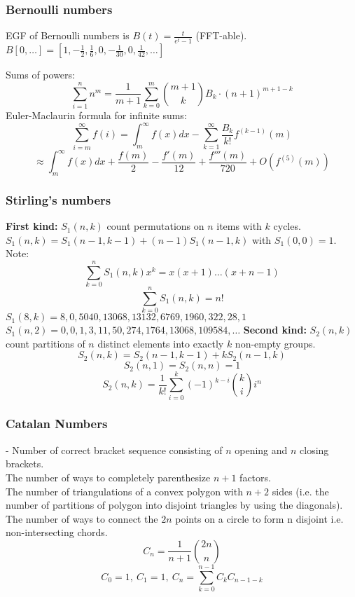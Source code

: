 \documentclass[
	a4paper,
	landscape,
	10pt,
]{article}
\begin{document}
\begin{multicols}{3}
	\subsubsection*{Bernoulli numbers}
		EGF of Bernoulli numbers is $B(t)=\frac{t}{e^t-1}$ (FFT-able).
		$B[0,\ldots] = [1, -\frac{1}{2}, \frac{1}{6}, 0, -\frac{1}{30}, 0, \frac{1}{42}, \ldots]$

		Sums of powers:
		\small
		\[ \sum_{i=1}^n n^m = \frac{1}{m+1} \sum_{k=0}^m \binom{m+1}{k} B_k \cdot (n+1)^{m+1-k} \]
		\normalsize
		Euler-Maclaurin formula for infinite sums:
		\small
		\[ \sum_{i=m}^{\infty} f(i) = \int_m^\infty f(x) dx - \sum_{k=1}^\infty \frac{B_k}{k!}f^{(k-1)}(m) \]
		\[ \approx \int_{m}^\infty f(x)dx + \frac{f(m)}{2} - \frac{f'(m)}{12} + \frac{f'''(m)}{720} + O(f^{(5)}(m)) \]
		\normalsize

	\subsubsection*{Stirling's numbers} \textbf{First kind:} $S_1(n, k)$ count permutations on $n$ items
		with $k$ cycles. $S_1(n, k) = S_1(n-1, k-1) + (n-1)S_1(n-1, k)$ with
		$S_1(0, 0) = 1$. Note:
		$$\sum_{k=0}^n S_1(n, k)x^k = x(x+1)\dots(x+n-1)$$
		$$ \sum_{k=0}^n S_1(n, k) = n! $$
		$S_1(8,k) = 8, 0, 5040, 13068, 13132, 6769, 1960, 322, 28, 1$ \\
		$S_1(n,2) = 0, 0, 1, 3, 11, 50, 274, 1764, 13068, 109584, \dots$
		\textbf{Second kind:} $S_2(n, k)$ count partitions of $n$
		distinct elements into exactly $k$ non-empty groups.
		$$ S_2(n, k) = S_2(n-1, k-1) + kS_2(n-1, k)$$
		$$S_2(n, 1) = S_2(n, n) = 1$$
		$$ S_2(n, k) = \frac{1}{k!}\sum_{i=0}^k (-1)^{k-i}\binom{k}{i}i^n $$

	\subsubsection*{Catalan Numbers} - Number of correct bracket sequence consisting of $n$ opening and $n$
		closing brackets. \\
		The number of ways to completely parenthesize $n+1$ factors. \\
		The number of triangulations of a convex polygon with $n+2$
		sides (i.e. the number of partitions of polygon into disjoint triangles by using the diagonals). \\
		The number of ways to connect the $2n$
		points on a circle to form n disjoint i.e. non-intersecting chords.
		$$ C_n = \frac{1}{n+1} \binom{2n}{n}$$
		$$ C_0 = 1,~C_1 = 1, ~C_n = \sum_{k=0}^{n-1}C_k C_{n-1-k}  $$


\end{multicols}
\end{document}
